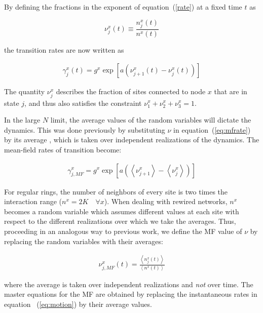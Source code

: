 By defining the fractions in the exponent of equation~(\ref{rate}) at a fixed time $t$ as

\begin{equation}
    \nu^x_j(t) \equiv \frac{n^x_j(t)}{n^x(t)}
\end{equation}

\noindent the transition rates are now written as

\begin{align}
    \gamma^x_j(t) = g^x\exp\left[ a(\nu^x_{j+1}(t) - \nu^x_j(t)) \right]
    \label{eq:mfrate}
\end{align}

The quantity $\nu^x_j$ describes the fraction of sites connected to node $x$ that are in state $j$, and thus also satisfies the
constraint $\nu^x_1+\nu^x_2+\nu^x_3=1$.

In the large $N$ limit, the average values of the random variables will dictate the dynamics. This was done previously by substituting
$\nu$ in equation~(\ref{eq:mfrate}) by its average \cite{escaff2014arrays}, which is taken over independent realizations of the
dynamics.  The mean-field rates of transition become:

\begin{align}
    \gamma^x_{j,MF} = g^x \exp \left[ a \left( \left< \nu^x_{j+1} \right> - \left< \nu^x_j \right> \right) \right]
    \label{gammaMF}
\end{align}

For regular rings, the number of neighbors of every site is two times the interaction range ($n^x = 2K \quad \forall x$). When dealing
with rewired networks, $n^x$ becomes a random variable which assumes different values at each site with respect to the different
realizations over which we take the averages. Thus, proceeding in an analogous way to previous work, we define the MF value of $\nu$ by
replacing the random variables with their averages:

\begin{align}
    \nu^x_{j,MF}(t) = \frac{\left< n^x_j(t) \right>}{\left< n^x(t) \right>}
    \label{eq:numfdef}
\end{align}

\noindent where the average is taken over independent realizations and \textit{not} over time. The master equations for the MF are
obtained by replacing the instantaneous rates in equation~ (\ref{eq:motion}) by their average values.

